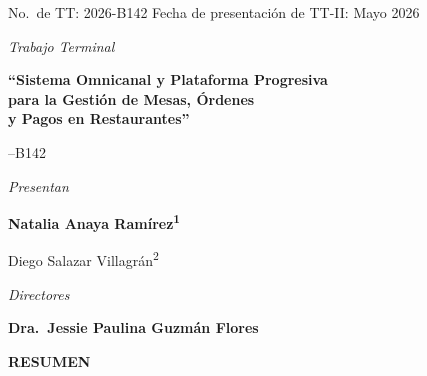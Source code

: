 \vspace{0.4cm}
\noindent
{\fontsize{11}{13}\selectfont No.~de TT: 2026-B142}
\hfill
{\fontsize{12}{15}\selectfont Fecha de presentaci\'on de TT-II: Mayo 2026}

\vspace{0.3cm}
\begin{center}
{\fontsize{14}{17}\selectfont\itshape Trabajo Terminal\par}
\vspace{0.3cm}
{\fontsize{16}{19}\selectfont\bfseries
  ``Sistema Omnicanal y Plataforma Progresiva\\[0.2cm]
  para la Gesti\'on de Mesas, \'Ordenes\\[0.2cm]
  y Pagos en Restaurantes''\par}

\vspace{0.3cm}
{\fontsize{14}{17}--B142\par}

\vspace{0.4cm}
{\fontsize{11}{13}\selectfont\itshape Presentan\par}
\vspace{0.2cm}

{\fontsize{11}{13}\selectfont\bfseries
  Natalia Anaya Ram\'irez\textsuperscript{1}\par
  \vspace{0.1cm}
  Diego Salazar Villagr\'an\textsuperscript{2}\par}

\vspace{0.4cm}
{\fontsize{11}{13}\selectfont\itshape Directores\par}
\vspace{0.15cm}
{\fontsize{11}{13}\selectfont\bfseries
  Dra.~Jessie Paulina Guzm\'an Flores\par}

\vspace{0.5cm}
{\fontsize{12}{15}\selectfont\bfseries RESUMEN\par}
\end{center}

